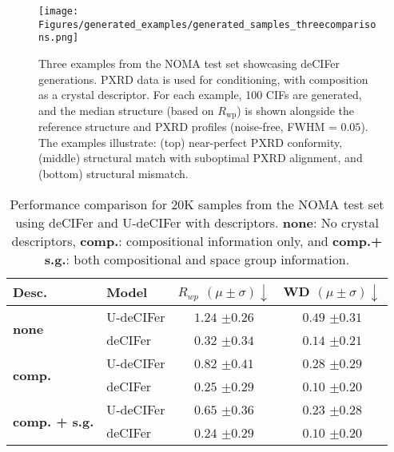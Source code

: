 \begin{figure}[t]
\vskip 0.2in
\begin{center}
\centerline{\texttt{[image: Figures/generated\_examples/generated\_samples\_threecomparisons.png]}}
\caption{
Three examples from the NOMA test set showcasing deCIFer generations. PXRD data is used for conditioning, with composition as a crystal descriptor. For each example, 100 CIFs are generated, and the median structure (based on $R_{\mathrm{wp}}$) is shown alongside the reference structure and PXRD profiles (noise-free, FWHM = $0.05$). The examples illustrate: (top) near-perfect PXRD conformity, (middle) structural match with suboptimal PXRD alignment, and (bottom) structural mismatch.
} \label{fig:gen_samples}
\end{center}
\vskip -0.2in
\end{figure}

\begin{table}[t]
\caption{Performance comparison for $20$K samples from the NOMA test set using deCIFer and U-deCIFer with descriptors. \textbf{none}: No crystal descriptors, \textbf{comp.}: compositional information only, and \textbf{comp.+ s.g.}: both compositional and space group information.}
\label{tab:baseline_performance}
\vskip 0.15in
\begin{center}
\scriptsize
\begin{tabular}{llcc}
\toprule
{\bf Desc.} & Model & $R_{wp}$ { $(\mu \pm \sigma) \downarrow$} & WD { $(\mu \pm \sigma) \downarrow$} \\
\midrule
\multirow{2}{*}{\bf none}           & U-deCIFer & $1.24$ {$\pm 0.26$} & $0.49$ { $\pm 0.31$} \\
                                & deCIFer   & $0.32$ { $\pm 0.34$} & $0.14$ { $\pm 0.21$} \\
\midrule
\multirow{2}{*}{\bf comp.}          & U-deCIFer & $0.82$ {\scriptsize $\pm 0.41$} & $0.28$ {\scriptsize $\pm 0.29$} \\
                                & deCIFer   & $0.25$ { $\pm 0.29$} & $0.10$ { $\pm 0.20$} \\
\midrule
\multirow{2}{*}{\bf comp. + s.g.}  & U-deCIFer & $0.65$ {\scriptsize $\pm 0.36$} & $0.23$ {\scriptsize $\pm 0.28$} \\
                                & deCIFer   & $0.24$ { $\pm 0.29$} & $0.10$ { $\pm 0.20$} \\
\bottomrule
\end{tabular}
\end{center}
\vspace{-0.3cm}
\end{table}

